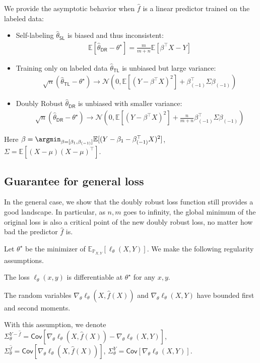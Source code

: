  \begin{proposition}\label{prop:mean_semi}
We provide the asymptotic behavior  when   $\hat f$  is a linear predictor trained on the labeled data:
\begin{itemize}
    \item Self-labeling $\hat\theta_{\mathsf{SL}}$ is biased and thus inconsistent: \begin{align*}
  &\mathbb{E}[\hat \theta_{\mathsf{DR}} - \theta^\star] =  \frac{m}{m+n}\mathbb{E}[\beta^\top X-Y]
\end{align*}
\item Training only on labeled data $\hat \theta_{\mathsf{TL}}$ is unbiased but large variance:
\begin{align*}
    & \sqrt{n}(\hat \theta_{\mathsf{TL}} - \theta^\star) \rightarrow \mathcal{N}(0, \mathbb{E}[(Y-\beta^\top X)^2] + \beta_{(-1)}^\top \Sigma\beta_{(-1)})
\end{align*}

\item Doubly Robust  $\hat \theta_{\mathsf{DR}}$ is unbiased with smaller variance:
\begin{align*}
    &\sqrt{n}(\hat \theta_{\mathsf{DR}} - \theta^\star) \rightarrow \mathcal{N}(0,  \mathbb{E}[(Y-\beta^\top X)^2] + \frac{n}{m+n} \beta_{(-1)}^\top \Sigma \beta_{(-1)})
\end{align*}
\end{itemize}
Here $\beta = \argmin_{\beta=[\beta_1, \beta_{(-1)}]} \mathbb{E}[(Y-\beta_1 - \beta_{(-1)}^\top X)^2]$,  $\Sigma = \mathbb{E}[(X-\mu)(X-\mu)^\top]$.
\end{proposition}

\subsection{Guarantee for general loss} 
In the general case, 
we  show that the doubly robust loss function still provides a good landscape. In particular,  as $n,m$ goes to infinity, the global minimum of the original loss is also a critical point of the new doubly robust loss, no matter how bad the predictor $\hat f$ is.  

Let $\theta^\star$ be the minimizer of $\mathbb{E}_{\mathbb{P}_{X, Y}}[\ell_\theta(X, Y)]$.
We  make the following regularity assumptions.
\begin{assumption}\label{ass:diff}
The loss $\ell_\theta(x, y)$ is  differentiable at $\theta^\star$ for any $x, y$.
\end{assumption}
\begin{assumption}\label{ass:mom}
The random variables $\nabla_\theta \ell_\theta(X, \hat f(X)) $ and  $\nabla_\theta \ell_\theta(X, Y)$ have bounded first and second moments.  
\end{assumption}
With this assumption, we denote $\Sigma_{\theta}^{Y-\hat f} = \mathsf{Cov}[\nabla_\theta \ell_\theta(X, \hat f(X)) - \nabla_\theta \ell_\theta(X, Y)]$, $\Sigma_{\theta}^{\hat f} = \mathsf{Cov}[\nabla_\theta \ell_\theta(X, \hat f(X))]$, $\Sigma_{\theta}^{Y} = \mathsf{Cov}[\nabla_\theta \ell_\theta(X, Y)]$. 
 
